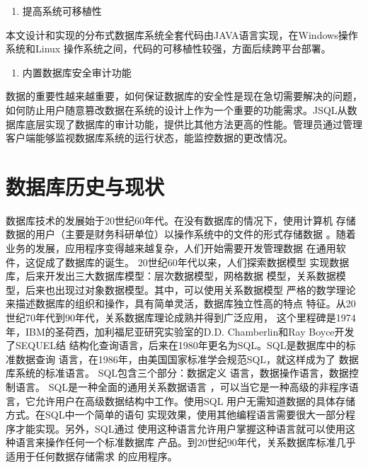 	\begin{enumerate}[resume]
		\item 提高系统可移植性
	\end{enumerate}

	本文设计和实现的分布式数据库系统全套代码由JAVA语言实现，在Windows操作系统和Linux
	操作系统之间，代码的可移植性较强，方面后续跨平台部署。
	
	\begin{enumerate}[resume]
		\item 内置数据库安全审计功能
	\end{enumerate}

	数据的重要性越来越重要，如何保证数据库的安全性是现在急切需要解决的问题，如何防止用户随意篡改数据在系统的设计上作为一个重要的功能需求。JSQL从数据库底层实现了数据库的审计功能，提供比其他方法更高的性能。管理员通过管理客户端能够监视数据库系统的运行状态，能监控数据的更改情况。
\section{数据库历史与现状}
数据库技术的发展始于20世纪60年代。在没有数据库的情况下，使用计算机
存储数据的用户（主要是财务科研单位）以操作系统中的文件的形式存储数据
。随着业务的发展，应用程序变得越来越复杂，人们开始需要开发管理数据
在通用软件，这促成了数据库的诞生。 20世纪60年代以来，人们探索数据模型
实现数据库，后来开发出三大数据库模型：层次数据模型，网格数据
模型，关系数据模型，后来也出现过对象数据模型。其中，可以使用关系数据模型
严格的数学理论来描述数据库的组织和操作，具有简单灵活，数据库独立性高的特点
特征。从20世纪70年代到90年代，关系数据库理论成熟并得到广泛应用，
这个里程碑是1974年，IBM的圣荷西，加利福尼亚研究实验室的D.D.
Chamberlin和Ray Boyce开发了SEQUEL结
结构化查询语言，后来在1980年更名为SQL。SQL是数据库中的标准数据查询
语言，在1986年，由美国国家标准学会规范SQL，就这样成为了
数据库系统的标准语言。 SQL包含三个部分：数据定义
语言，数据操作语言，数据控制语言。 SQL是一种全面的通用关系数据语言
，可以当它是一种高级的非程序语言，它允许用户在高级数据结构中工作。使用SQL
用户无需知道数据的具体存储方式。在SQL中一个简单的语句
实现效果，使用其他编程语言需要很大一部分程序才能实现。另外，SQL通过
使用这种语言允许用户掌握这种语言就可以使用这种语言来操作任何一个标准数据库
产品。到20世纪90年代，关系数据库标准几乎适用于任何数据存储需求
的应用程序。

